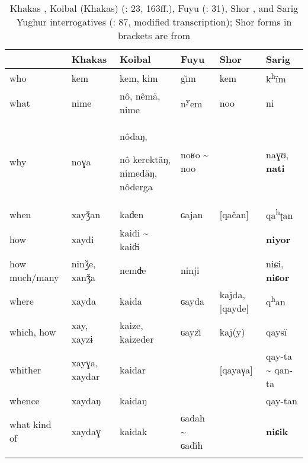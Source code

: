 \begin{table}
\small
\caption{Khakas \citep[21]{Anderson1998}, Koibal (Khakas) (\citealt{Castrén1857b}: 23, 163ff.), Fuyu (\citealt{HuImart1987}: 31), Shor \citep[505]{Donidze1997}, and Sarig Yughur interrogatives (\citealt{Roos2000}: 87, modified transcription); Shor forms in brackets are from \citet[294]{Nevskaja2000}}
\label{tab:turk:15}

\begin{tabularx}{\textwidth}{QlQQQQ}
\lsptoprule
& \textbf{Khakas} & \textbf{Koibal} & \textbf{Fuyu} & \textbf{Shor} & \textbf{Sarig}\\
\midrule
who & kem & kem, kim & g\u{\i}m & kem & k\textsuperscript{h}ïm\\
what & nime & nô, nêmä, nime & n\textsuperscript{y}em & noo & ni\\
why & noɣa & nôdaŋ,

nô kerektäŋ, nimedäŋ, nôderga & noʁo {\textasciitilde} noo &  & naɣʊ, \textbf{nati}\\
when & xayǯan & ka{d̴}en & ɢajan & [qačan] & qa\textsuperscript{h}ʈan\\
how & xaydi & kaidi {\textasciitilde} kai{d̴}i &  &  & \textbf{niyor}\\
how much/many & ninǯe, xanǯa & nem{d̴}e & ninji &  & niɕi, \textbf{niɕor}\\
where & xayda & kaida & ɢayda & kajda, [qayde] & q\textsuperscript{h}an\\
which, how & xay, xayzɨ & kaize, kaizeder & ɢayz\u{\i} & kaj(y) & qaysï\\
whither & xayɣa, xaydar & kaidar &  & [qayaγa] & qay-ta {\textasciitilde} qan-ta\\
whence & xaydaŋ & kaidaŋ &  &  & qay-tan\\
what kind of & xaydaɣ & kaidak & ɢadah {\textasciitilde} ɢad\u{\i}h &  & \textbf{niɕik}\\
\lspbottomrule
\end{tabularx}
\end{table}

